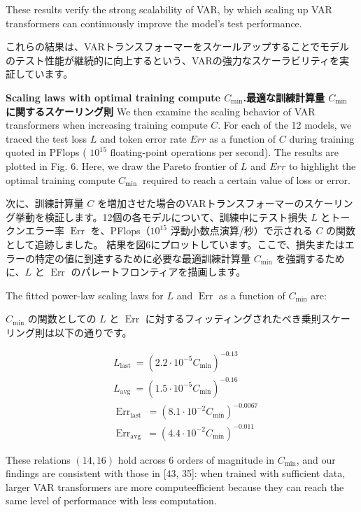 \documentclass{article}
\begin{document}
These results verify the strong scalability of VAR, by which scaling up VAR transformers can continuously improve the model's test performance.

これらの結果は、VARトランスフォーマーをスケールアップすることでモデルのテスト性能が継続的に向上するという、VARの強力なスケーラビリティを実証しています。

\textbf{Scaling laws with optimal training compute $C_{\min }$.最適な訓練計算量 $C_{\text{min}}$ に関するスケーリング則} We then examine the scaling behavior of VAR transformers when increasing training compute $C$. For each of the 12 models, we traced the test loss $L$ and token error rate $Err$ as a function of $C$ during training quoted in PFlops ( $10^{15}$ floating-point operations per second).
The results are plotted in Fig. 6. Here, we draw the Pareto frontier of $L$ and $E r r$ to highlight the optimal training compute $C_{\text {min }}$ required to reach a certain value of loss or error.

次に、訓練計算量 $C$ を増加させた場合のVARトランスフォーマーのスケーリング挙動を検証します。12個の各モデルについて、訓練中にテスト損失 $L$ とトークンエラー率 $\operatorname{Err}$ を、PFlops（$10^{15}$ 浮動小数点演算/秒）で示される $C$ の関数として追跡しました。
結果を図6にプロットしています。ここで、損失またはエラーの特定の値に到達するために必要な最適訓練計算量 $C_{\text{min}}$ を強調するために、$L$ と $\operatorname{Err}$ のパレートフロンティアを描画します。

The fitted power-law scaling laws for $L$ and $\operatorname{Err}$ as a function of $C_{\min }$ are:

$C_{\text{min}}$ の関数としての $L$ と $\operatorname{Err}$ に対するフィッティングされたべき乗則スケーリング則は以下の通りです。

$$
\begin{aligned}
& L_{\text {last }}=\left(2.2 \cdot 10^{-5} C_{\min }\right)^{-0.13} \\
& L_{\text {avg }}=\left(1.5 \cdot 10^{-5} C_{\min }\right)^{-0.16} \\
& \operatorname{Err}_{\text {last }}=\left(8.1 \cdot 10^{-2} C_{\min }\right)^{-0.0067} \\
& \operatorname{Err}_{\text {avg }}=\left(4.4 \cdot 10^{-2} C_{\min }\right)^{-0.011}
\end{aligned}
$$

These relations $(14,16)$ hold across 6 orders of magnitude in $C_{\min }$, and our findings are consistent with those in [43, 35]: when trained with sufficient data, larger VAR transformers are more computeefficient because they can reach the same level of performance with less computation.
\end{document}
